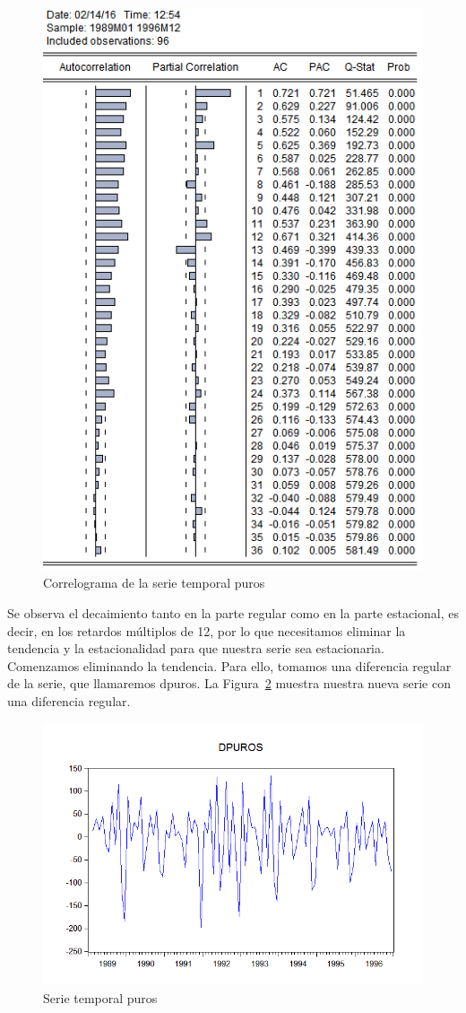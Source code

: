 \documentclass[12pt,a4paper,twoside,openright,titlepage,final]{article}
\begin{document}
\begin{figure}[tbph!]
	\centering
	\includegraphics[width=0.8\linewidth]{imagenes/puros/correlograma-puros.png}
	\caption{Correlograma de la serie temporal puros}
	\label{fig:correlograma-puros}
\end{figure}

Se observa el decaimiento tanto en la parte regular como en la parte estacional, es decir, en los retardos múltiplos de 12, por lo que necesitamos eliminar la tendencia y la estacionalidad para que nuestra serie sea estacionaria.\\

Comenzamos eliminando la tendencia. Para ello, tomamos una diferencia regular de la serie, que llamaremos dpuros. La Figura~\ref{fig:puros-diferenciada} muestra nuestra nueva serie con una diferencia regular.\\

\begin{figure}[tbph!]
	\centering
	\includegraphics[width=0.8\linewidth]{imagenes/puros/puros-diferenciada.png}
	\caption{Serie temporal puros}
	\label{fig:puros-diferenciada}
\end{figure}
\end{document}
